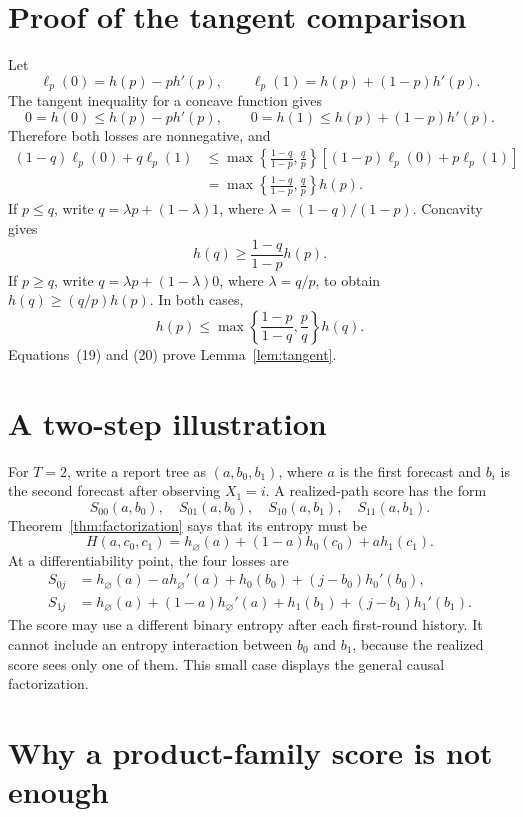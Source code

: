 \documentclass{article}
\theoremstyle{definition}
\theoremstyle{remark}
\newcommand{\1}{\mathbf 1}
\begin{document}
\section{Proof of the tangent comparison}\label{app:tangent}

Let \[ \ell_p(0)=h(p)-ph'(p), \qquad \ell_p(1)=h(p)+(1-p)h'(p). \] The tangent inequality for a concave function gives \[ 0=h(0)\le h(p)-ph'(p), \qquad 0=h(1)\le h(p)+(1-p)h'(p). \] Therefore both losses are nonnegative, and
\begin{align*}
(1-q)\ell_p(0)+q\ell_p(1)
&\le\max\left\{\frac{1-q}{1-p},\frac q p\right\}
[(1-p)\ell_p(0)+p\ell_p(1)]\\
&=\max\left\{\frac{1-q}{1-p},\frac q p\right\}h(p).
\tag{19}
\end{align*}
If \(p\le q\), write \(q=\lambda p+(1-\lambda)1\), where \(\lambda=(1-q)/(1-p)\). Concavity gives \[ h(q)\ge\frac{1-q}{1-p}h(p). \] If \(p\ge q\), write \(q=\lambda p+(1-\lambda)0\), where \(\lambda=q/p\), to obtain \(h(q)\ge(q/p)h(p)\). In both cases, \[ h(p)\le\max\left\{\frac{1-p}{1-q},\frac p q\right\}h(q). \tag{20} \] Equations~(19) and (20) prove Lemma~\ref{lem:tangent}.

\section{A two-step illustration}\label{app:two-step}

For \(T=2\), write a report tree as \((a,b_0,b_1)\), where \(a\) is the first forecast and \(b_i\) is the second forecast after observing \(X_1=i\). A realized-path score has the form \[ S_{00}(a,b_0),\quad S_{01}(a,b_0),\quad S_{10}(a,b_1),\quad S_{11}(a,b_1). \] Theorem~\ref{thm:factorization} says that its entropy must be \[ H(a,c_0,c_1)=h_\varnothing(a)+(1-a)h_0(c_0)+ah_1(c_1). \] At a differentiability point, the four losses are
\begin{align*}
S_{0j}&=h_\varnothing(a)-ah_\varnothing'(a)+h_0(b_0)+(j-b_0)h_0'(b_0),\\
S_{1j}&=h_\varnothing(a)+(1-a)h_\varnothing'(a)+h_1(b_1)+(j-b_1)h_1'(b_1).
\end{align*}
The score may use a different binary entropy after each first-round history. It cannot include an entropy interaction between \(b_0\) and \(b_1\), because the realized score sees only one of them. This small case displays the general causal factorization.

\section{Why a product-family score is not enough}\label{app:product}
\end{document}
